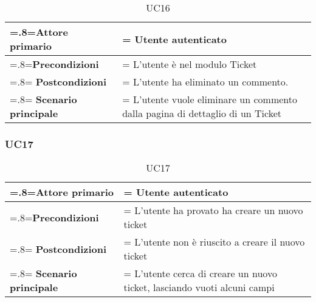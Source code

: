        \begin{table}[H]
                \centering
                \renewcommand{\arraystretch}{1.8}
                \renewcommand\tabularxcolumn[1]{m{#1}}
                \begin{tabularx}{0.9\textwidth} {
                    >{\hsize=.8\hsize\linewidth=\hsize}X
                    >{\hsize=1.2\hsize\linewidth=\hsize}X}
                    \hline
                    \textbf{Attore primario} & Utente autenticato \\
                    \hline
                    \textbf{Precondizioni} & L'utente è nel modulo Ticket\\
                    \hline
                    \textbf{Postcondizioni} & L'utente ha eliminato un commento.\\
                    \hline
                    \textbf{Scenario principale} & L'utente vuole eliminare un commento dalla pagina di dettaglio di un Ticket \\
                    \hline
                    
                \end{tabularx}
                \caption{UC16}
            \end{table}    

                  
\subsubsection{UC17}
            
             \begin{table}[H]
                \centering
                \renewcommand{\arraystretch}{1.8}
                \renewcommand\tabularxcolumn[1]{m{#1}}
                \begin{tabularx}{0.9\textwidth} {
                    >{\hsize=.8\hsize\linewidth=\hsize}X
                    >{\hsize=1.2\hsize\linewidth=\hsize}X}
                    \hline
                    \textbf{Attore primario} & Utente autenticato \\
                    \hline
                    \textbf{Precondizioni} & L'utente ha provato ha creare un nuovo ticket \\
                    \hline
                    \textbf{Postcondizioni} & L'utente non è riuscito a creare il nuovo ticket\\
                    \hline
                    \textbf{Scenario principale} & L'utente cerca di creare un nuovo ticket, lasciando vuoti alcuni campi\\
                   
                \end{tabularx}
                \caption{UC17}
            \end{table}
            
